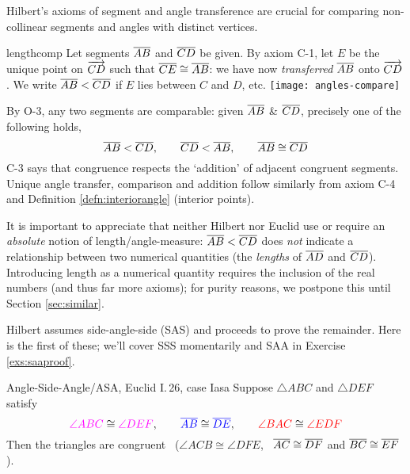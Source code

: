 
Hilbert's axioms of segment and angle transference are crucial for comparing non-collinear segments and angles with distinct vertices.


\begin{defn}[lower separated=false, sidebyside, sidebyside align=top seam, sidebyside gap=0pt, righthand width=0.35\linewidth]{}{lengthcomp}
	Let segments $\overline{AB}$ and $\overline{CD}$ be given.\smallbreak
	By axiom C-1, let $E$ be the unique point on $\overrightarrow{CD}$ such that $\overline{CE}\cong\overline{AB}$: we have now \emph{transferred} $\overline{AB}$ onto $\overrightarrow{CD}$.\smallbreak
	We write $\overline{AB}<\overline{CD}$ if $E$ lies between $C$ and $D$, etc.
	\tcblower
	\flushright
	\texttt{[image: angles-compare]}
\end{defn}

By O-3, any two segments are comparable: given $\overline{AB}$ \& $\overline{CD}$, precisely one of the following holds,
\[
	\overline{AB}<\overline{CD}, \qquad \overline{CD}<\overline{AB}, \qquad\overline{AB}\cong\overline{CD}
\]
C-3 says that congruence respects the `addition' of adjacent congruent segments. Unique angle transfer, comparison and addition follow similarly from axiom C-4 and Definition \ref{defn:interiorangle} (interior points).\smallbreak

It is important to appreciate that neither Hilbert nor Euclid use or require an \emph{absolute} notion of length/angle-measure: $\overline{AB}<\overline{CD}$ does \emph{not} indicate a relationship between two numerical quantities (the \emph{lengths} of $\overline{AD}$ and $\overline{CD}$). Introducing length as a numerical quantity requires the inclusion of the real numbers (and thus far more axioms); for purity reasons, we postpone this until Section \ref{sec:similar}.
 

\goodbreak


Hilbert assumes side-angle-side (SAS) and proceeds to prove the remainder. Here is the first of these; we'll cover SSS momentarily and SAA in Exercise \ref{exs:saaproof}.

\begin{thm}{Angle-Side-Angle/ASA, Euclid I.\,26, case I}{asa}
	Suppose $\triangle ABC$ and $\triangle DEF$ satisfy
	\[
		\textcolor{Magenta}{\angle ABC}\cong\textcolor{Magenta}{\angle DEF},\qquad \textcolor{blue}{\cl{AB}}\cong\textcolor{blue}{\cl{DE}},\qquad \textcolor{red}{\angle BAC}\cong\textcolor{red}{\angle EDF}
	\]
	Then the triangles are congruent \ ($\angle ACB\cong\angle DFE$, \ $\overline{AC}\cong\overline{DF}$ and $\overline{BC}\cong\overline{EF}$).
\end{thm}

